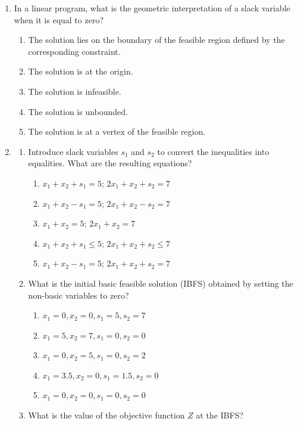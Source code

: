\documentclass{article}%
\begin{document}
\begin{enumerate}
\begin{enumerate}
\end{enumerate}%
\vspace{1em}%
\item In a linear program, what is the geometric interpretation of a slack variable when it is equal to zero?%
\begin{enumerate}%
\item The solution lies on the boundary of the feasible region defined by the corresponding constraint.%
\item The solution is at the origin.%
\item The solution is infeasible.%
\item The solution is unbounded.%
\item The solution is at a vertex of the feasible region.%
\end{enumerate}%
\vspace{1em}%
\item%
\begin{enumerate}%
\item Introduce slack variables $s_1$ and $s_2$ to convert the inequalities into equalities. What are the resulting equations?%
\begin{enumerate}%
\item $x_1 + x_2 + s_1 = 5$; $2x_1 + x_2 + s_2 = 7$%
\item $x_1 + x_2 - s_1 = 5$; $2x_1 + x_2 - s_2 = 7$%
\item $x_1 + x_2 = 5$; $2x_1 + x_2 = 7$%
\item $x_1 + x_2 + s_1 \le 5$; $2x_1 + x_2 + s_2 \le 7$%
\item $x_1 + x_2 - s_1 = 5$; $2x_1 + x_2 + s_2 = 7$%
\end{enumerate}%
\vspace{0.5em}%
\item What is the initial basic feasible solution (IBFS) obtained by setting the non-basic variables to zero?%
\begin{enumerate}%
\item $x_1 = 0, x_2 = 0, s_1 = 5, s_2 = 7$%
\item $x_1 = 5, x_2 = 7, s_1 = 0, s_2 = 0$%
\item $x_1 = 0, x_2 = 5, s_1 = 0, s_2 = 2$%
\item $x_1 = 3.5, x_2 = 0, s_1 = 1.5, s_2 = 0$%
\item $x_1 = 0, x_2 = 0, s_1 = 0, s_2 = 0$%
\end{enumerate}%
\vspace{0.5em}%
\item What is the value of the objective function $Z$ at the IBFS?%

\end{enumerate}
\end{enumerate}
\end{document}
